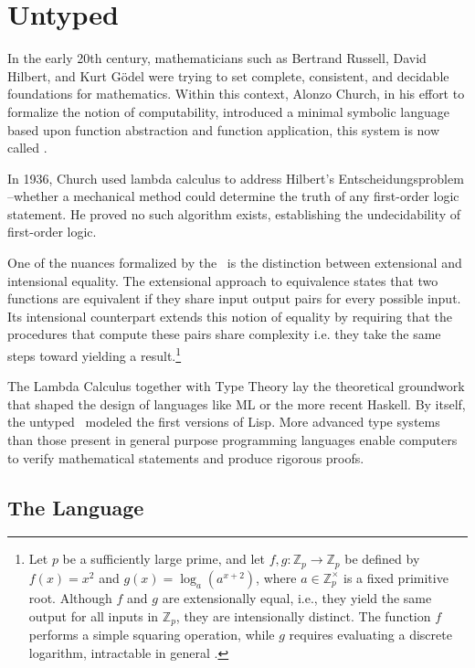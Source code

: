 \chapter{Untyped \lCalc}

In the early 20th century, mathematicians such as Bertrand Russell, David Hilbert, and Kurt Gödel were trying to set complete, consistent, and decidable foundations for mathematics. Within this context, Alonzo Church, in his effort to formalize the notion of computability, introduced a minimal symbolic language based upon function abstraction and function application, this system is now called \lcalc.

In 1936, Church used lambda calculus to address Hilbert’s Entscheidungsproblem --whether a mechanical method could determine the truth of any first-order logic statement. He proved no such algorithm exists, establishing the undecidability of first-order logic.

One of the nuances formalized by the \lcalc \ is the distinction between extensional and intensional equality. The extensional approach to equivalence states that two functions are equivalent if they share input output pairs for every possible input. Its intensional counterpart extends this notion of equality by requiring that the procedures that compute these pairs share complexity i.e. they take the same steps toward yielding a result.\footnote{
  Let \( p \) be a sufficiently large prime, and let \( f, g : \mathbb{Z}_p \to \mathbb{Z}_p \) be defined by \( f(x) = x^2 \) and \( g(x) = \log_a(a^{x+2}) \), where \( a \in \mathbb{Z}_p^\times \) is a fixed primitive root. Although \( f \) and \( g \) are extensionally equal, i.e., they yield the same output for all inputs in \( \mathbb{Z}_p \), they are intensionally distinct. The function \( f \) performs a simple squaring operation, while \( g \) requires evaluating a discrete logarithm, intractable in general \cite{bonilla2021}.}

The Lambda Calculus together with Type Theory lay the theoretical groundwork that shaped the design of languages like ML or the more recent Haskell. By itself, the untyped \lcalc \ modeled the first versions of Lisp. More advanced type systems than those present in general purpose programming languages enable computers to verify mathematical statements and produce rigorous proofs.



\section{\centering The Language}

